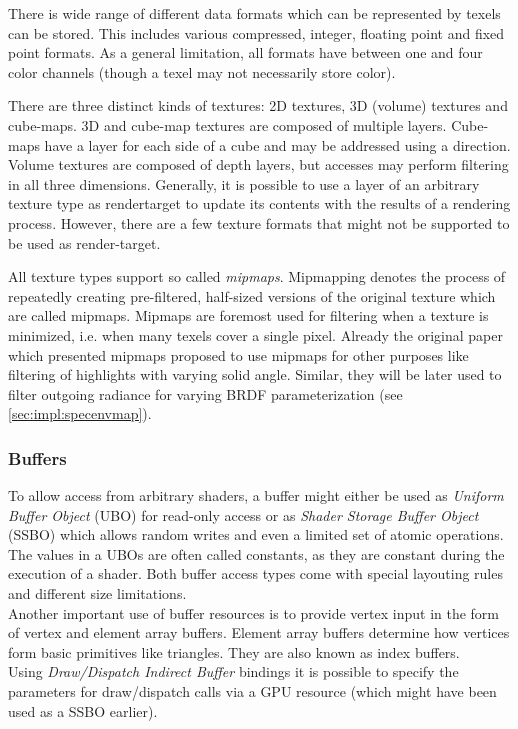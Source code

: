 \documentclass[thesis.tex]{subfiles}
\begin{document}
There is wide range of different data formats which can be represented by texels can be stored.
This includes various compressed, integer, floating point and fixed point formats.
As a general limitation, all formats have between one and four color channels (though a texel may not necessarily store color).

There are three distinct kinds of textures: 2D textures, 3D (volume) textures and cube-maps.
3D and cube-map textures are composed of multiple layers.
Cube-maps have a layer for each side of a cube and may be addressed using a direction.
Volume textures are composed of depth layers, but accesses may perform filtering in all three dimensions.
Generally, it is possible to use a layer of an arbitrary texture type as rendertarget to update its contents with the results of a rendering process.
However, there are a few texture formats that might not be supported to be used as render-target.

All texture types support so called \emph{mipmaps}.
Mipmapping denotes the process of repeatedly creating pre-filtered, half-sized versions of the original texture which are called mipmaps.
Mipmaps are foremost used for filtering when a texture is minimized, i.e. when many texels cover a single pixel.
Already the original paper \cite{bib:mipmap} which presented mipmaps proposed to use mipmaps for other purposes like filtering of highlights with varying solid angle.
Similar, they will be later used to filter outgoing radiance for varying BRDF parameterization (see \autoref{sec:impl:specenvmap}).

\subsubsection{Buffers}
To allow access from arbitrary shaders, a buffer might either be used as \emph{Uniform Buffer Object} (UBO) for read-only access or as \emph{Shader Storage Buffer Object} (SSBO) which allows random writes and even a limited set of atomic operations.
The values in a UBOs are often called constants, as they are constant during the execution of a shader.
Both buffer access types come with special layouting rules and different size limitations.
\\
Another important use of buffer resources is to provide vertex input in the form of vertex and element array buffers.
Element array buffers determine how vertices form basic primitives like triangles. 
They are also known as index buffers.
\\
Using \emph{Draw/Dispatch Indirect Buffer} bindings it is possible to specify the parameters for draw/dispatch calls via a GPU resource (which might have been used as a SSBO earlier).
\end{document}
